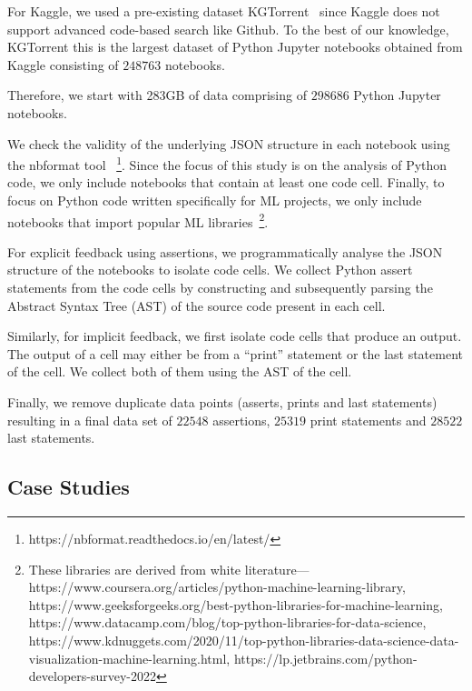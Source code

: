 For Kaggle, we used a pre-existing dataset KGTorrent~\cite{quaranta2021kgtorrent} since Kaggle does not support advanced code-based search like Github. To the best of our knowledge, KGTorrent this is the largest dataset of Python Jupyter notebooks obtained from Kaggle consisting of $248763$ notebooks.

Therefore, we start with 283GB of data comprising of $298686$ Python Jupyter notebooks.

We check the validity of the underlying JSON structure in each notebook using the nbformat tool ~\footnote{https://nbformat.readthedocs.io/en/latest/}. Since the focus of this study is on the analysis of Python code, we only include notebooks that contain at least one code cell. Finally, to focus on Python code written specifically for ML projects, we only include notebooks that import popular ML libraries~\footnote{These libraries are derived from white literature---https://www.coursera.org/articles/python-machine-learning-library, https://www.geeksforgeeks.org/best-python-libraries-for-machine-learning, https://www.datacamp.com/blog/top-python-libraries-for-data-science, https://www.kdnuggets.com/2020/11/top-python-libraries-data-science-data-visualization-machine-learning.html, https://lp.jetbrains.com/python-developers-survey-2022}.

For explicit feedback using assertions, we programmatically analyse the JSON structure of the notebooks to isolate code cells. We collect Python assert statements from the code cells by constructing and subsequently parsing the Abstract Syntax Tree (AST) of the source code present in each cell.

Similarly, for implicit feedback, we first isolate code cells that produce an output. The output of a cell may either be from a ``print'' statement or the last statement of the cell. We collect both of them using the AST of the cell.

Finally, we remove duplicate data points (asserts, prints and last statements) resulting in a final data set of $22548$ assertions, $25319$ print statements and $28522$ last statements.

\subsection{Case Studies}


